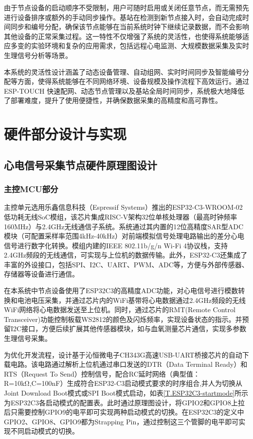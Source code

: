 由于节点设备的启动顺序不受限制，用户可随时启用或关闭任意节点，而无需预先进行设备排序或额外的手动同步操作。基站在检测到新节点接入时，会自动完成时间同步和编号分配，确保该节点能够在当前系统时钟下继续记录数据，而不会影响其他设备的正常采集过程。这一特性不仅增强了系统的灵活性，也使得系统能够适应多变的实验环境和复杂的应用需求，包括远程心电监测、大规模数据采集及实时生理信号分析等场景。

本系统的灵活性设计涵盖了动态设备管理、自动组网、实时时间同步及智能编号分配等方面，使得系统能够在不同网络环境、设备规模及操作流程下高效运行。通过ESP-TOUCH 快速配网、动态节点管理以及基站全局时间同步，系统极大地降低了部署难度，提升了使用便捷性，并确保数据采集的高精度和高可靠性。

\newpage    %

\section{硬件部分设计与实现}

\subsection{心电信号采集节点硬件原理图设计}

\subsubsection{主控MCU部分}

主控单元选用乐鑫信息科技（Espressif Systems）推出的ESP32-C3-WROOM-02低功耗无线SoC模组，该芯片集成RISC-V架构32位单核处理器（最高时钟频率160MHz）与2.4GHz无线通信子系统。系统通过其内置的12位高精度SAR型ADC模块（可配置采样率范围4kHz-40kHz）对前端模拟信号处理电路输出的差分心电信号进行数字化转换。模组内建的IEEE 802.11b/g/n Wi-Fi 4协议栈，支持2.4GHz频段的无线通信，可实现与上位机的数据传输。此外，ESP32-C3还集成了丰富的外设接口，包括SPI、I2C、UART、PWM、ADC等，方便与外部传感器、存储器等设备进行通信。

在本系统中节点设备使用了ESP32C3的高精度ADC功能，对心电信号进行模数转换和电池电压采集，并通过芯片内的WiFi基带将心电数据通过2.4GHz频段的无线WiFi网络将心电数据发送至上位机。同时，通过芯片的RMT(Remote Control Transceiver)功能控制板载WS2812的颜色及闪烁频率，实现设备状态的指示。并预留I2C接口，方便后续扩展其他传感器模块，如与血氧测量芯片通信，实现多参数生理信号采集。

为优化开发流程，设计基于沁恒微电子CH343G高速USB-UART桥接芯片的自动下载电路。该电路通过解析上位机通过串口发送的DTR（Data Terminal Ready）和RTS（Request To Send）控制信号，配合RC延时网络（典型值：R=10kΩ,C=100nF）生成符合ESP32-C3启动模式要求的时序组合,并人为切换从Joint Download Boot模式或SPI Boot模式启动，如表\ref{T.ESP32C3-startmode}所示为ESP32C3各启动模式的配置表。此时通过原理图设计，将GPIO2和GPIO8上拉后只需要控制GPIO9的电平即可实现两种启动模式的切换。在ESP32C3的定义中GPIO2、GPIO8、GPIO9都为Strapping Pin，通过控制这三个管脚的电平即可实现不同启动模式的切换。

